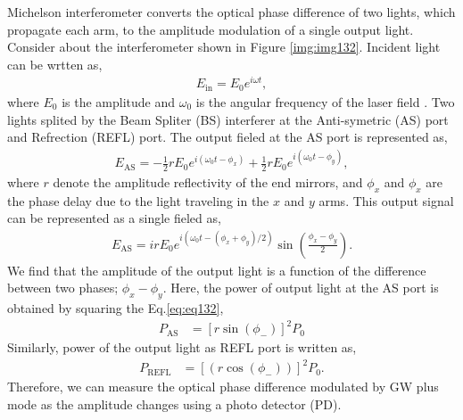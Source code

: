Michelson interferometer converts the optical phase difference of two lights, which propagate each arm, to the amplitude modulation of a single output light. Consider about the interferometer shown in Figure  \ref{img:img132}. Incident light can be wrtten as,
\begin{eqnarray}
  E_{\mathrm{in}} = E_{0} e^{i\omega{t}},
\end{eqnarray}
where $E_0$ is the amplitude and $\omega_0$ is the angular frequency of the laser field
. Two lights splited by the Beam Spliter (BS) interferer at the Anti-symetric (AS) port and Refrection (REFL) port. The output fieled at the AS port is represented as,
\begin{eqnarray}
  E_{\mathrm{AS}} = -\frac{1}{2}rE_{0} e^{i\left(\omega_{0} t-\phi_{x}\right)}+\frac{1}{2}r E_{0} e^{i\left(\omega_{0} t-\phi_{y}\right)},
\end{eqnarray}
where $r$ denote the amplitude reflectivity of the end mirrors, and $\phi_{x}$ and $\phi_{x}$ are the phase delay due to the light traveling in the $x$ and $y$ arms. This output signal can be represented as a single fieled as,
\begin{eqnarray}
E_{\mathrm{AS}} = i r E_{0} e^{i\left(\omega_{0} t-\left(\phi_{x}+\phi_{y}\right) / 2\right)} \sin \left(\frac{\phi_{x}-\phi_{y}}{2}\right). \label{eq:eq132}
\end{eqnarray} 
We find that the amplitude of the output light is a function of the difference between two phases; $\phi_{x}-\phi_{y}$. Here, the power of output light at the AS port is obtained by squaring the Eq.\ref{eq:eq132}, 
\begin{eqnarray}
  P_{\mathrm{AS}} &=\left[r\sin({\phi_{-}})\right]^2P_0  \label{eq:eq133}
\end{eqnarray}
Similarly, power of the output light as REFL port is written as,
\begin{eqnarray}
  P_{\mathrm{REFL}} &=\left[(r\cos({\phi_{-}}))\right]^2P_0. \label{eq:eq134}
\end{eqnarray}
Therefore, we can measure the optical phase difference modulated by GW plus mode as the amplitude changes using a photo detector (PD).

